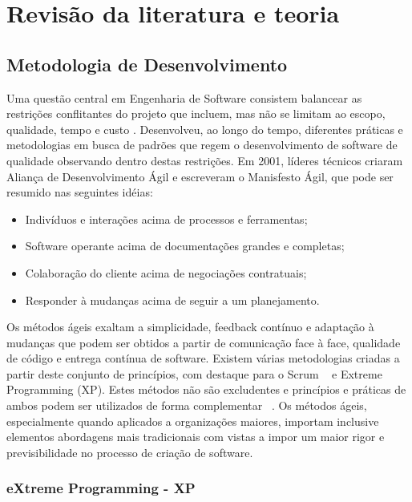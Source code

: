 \section{Revisão da literatura e teoria}

\subsection{Metodologia de Desenvolvimento}
\label{desenvolvimento}

Uma questão central em Engenharia de Software consistem balancear as restrições conflitantes do projeto que incluem, mas não se limitam ao escopo, qualidade, tempo e custo .
Desenvolveu, ao longo do tempo, diferentes práticas e metodologias em busca de padrões que regem o desenvolvimento de software de qualidade observando dentro destas restrições. Em 2001, líderes técnicos criaram Aliança de Desenvolvimento Ágil e escreveram o Manisfesto Ágil, que pode ser resumido nas seguintes idéias:

\begin{itemize}
\item Indivíduos e interações acima de processos e ferramentas;
\item Software operante acima de documentações grandes e completas;
\item Colaboração do cliente acima de negociações contratuais;
\item Responder à mudanças acima de seguir a um planejamento.
\end{itemize}

Os métodos ágeis exaltam a simplicidade, feedback contínuo e adaptação à mudanças que podem ser obtidos 
a partir de comunicação face à face, qualidade de código e entrega contínua de software. Existem várias metodologias criadas a
partir deste conjunto de princípios, com destaque para o Scrum ~\cite{schwaber2001} e Extreme Programming (XP). Estes métodos 
não são excludentes e princípios e práticas de ambos podem ser utilizados de forma complementar ~\cite{fitzgerald2006}. 
Os métodos ágeis, especialmente quando aplicados a organizações maiores, importam inclusive elementos abordagens mais tradicionais 
com vistas a impor um maior rigor e previsibilidade no processo de criação de software.

\subsubsection{eXtreme Programming - XP}

